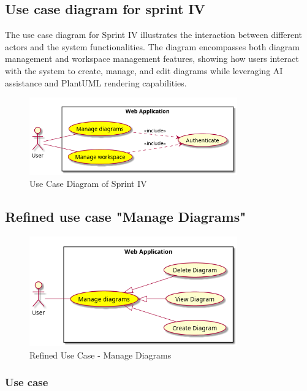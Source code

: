 \subsection{Use case diagram for sprint IV}
The use case diagram for Sprint IV illustrates the interaction between different actors and the system functionalities. The diagram encompasses both diagram management and workspace management features, showing how users interact with the system to create, manage, and edit diagrams while leveraging AI assistance and PlantUML rendering capabilities.

\begin{figure}[H]
\centering
\includegraphics[width=0.8\textwidth]{conception/SprintIV/use_case_diagrams/use_case_diagram_of_SprintIV.png}
\caption{Use Case Diagram of Sprint IV}
\end{figure}

\subsection{Refined use case "Manage Diagrams"}

\begin{figure}[H]
\centering
\includegraphics[width=0.8\textwidth]{conception/SprintIV/use_case_diagrams/refined_use_case_feature_diagram_management.png}
\caption{Refined Use Case - Manage Diagrams}
\end{figure}

\subsubsection{Use case}

